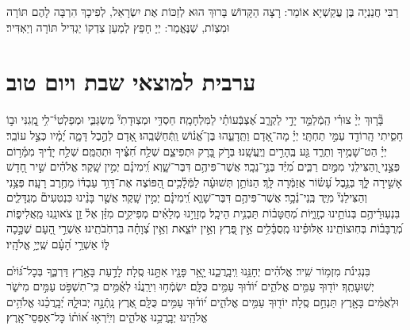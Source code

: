 \documentclass[twoside, openany, parskip=half, 11pt]{book}
\begin{document}

רַבִּי חֲנַנְיָה בֶּן עֲקַשְׁיָא אוֹמֵר: 
רָצָה הַקָּדוֹשׁ בָּרוּךְ הוּא לְזַכּוֹת אֶת יִשְׂרָאֵל, לְפִיכָךְ הִרְבָּה לָהֶם תּוֹרָה וּמִצְוֹת, 
שֶׁנֶּאֱמַר: יְיָ חָפֵץ לְמַעַן צִדְקוֹ יַגְדִּיל תּוֹרָה וְיַאְדִּיר׃


\mournerskaddish

\aleinu

\vfill
{}\quad{}\quad{}





\chapter[ערבית למוצאי שבת ויום טוב]{  ערבית למוצאי שבת ויום טוב }

 
 בָּ֘ר֤וּךְ יְיָ֨ צוּרִ֗י הַֽמְֿלַמֵּ֣ד יָדַ֣י לַקְרָ֑ב אֶ֝צְבְּֿעוֹתַ֗י לַמִּלְחָמָֽה׃ 
חַסְדִּ֥י וּמְצֽוּדָתִי֘ מִשְׂגַּבִּ֢י וּמְפַלְטִי֫־לִ֥י מָֽ֭גִנִּי וּב֣וֹ חָסִ֑יתִי הָֽרוֹדֵ֖ד עַמִּ֣י תַחְתָּֽי׃ 
יְיָ֗ מָה־אָ֭דָם וַתֵּֽדָעֵ֑הוּ בֶּן־אֱ֝נ֗וֹשׁ וַֽתְּֿחַשְּֿׁבֵֽהוּ׃ 
אָ֭דָם לַהֶ֣בֶל דָּמָ֑ה יָ֝מָ֗יו כְּצֵ֣ל עוֹבֵֽר׃ 
יְיָ֗ הַט־שָׁמֶ֥יךָ וְתֵרֵ֑ד גַּ֖ע בֶּֽהָרִ֣ים וְיֶֽעֱשָֽׁנוּ׃ 
בְּרֹ֣ק בָּ֭רָק וּתְפִיצֵ֑ם שְׁלַ֥ח חִ֝צֶּ֗יךָ וּתְהֻמֵּֽם׃ 
שְׁלַ֥ח יָדֶ֗יךָ מִמָּ֫ר֥וֹם פְּצֵ֣נִי וְ֭הַצִּילֵנִי מִמַּ֣יִם רַבִּ֑ים מִ֝יַּ֗ד בְּנֵ֣י־נֵכָֽר׃ 
אֲשֶׁר־פִּיהֶ֥ם דִּבֶּר־שָׁ֑וְא וִֽ֝ימִינָ֗ם יְמִ֣ין שָֽׁקֶר׃ 
אֱלֹהִ֗ים שִׁ֣יר חָ֭דָשׁ אָשִׁ֣ירָה לָּ֑ךְ בְּנֵ֥בֶל עָ֝שׂ֗וֹר אֲזַמְּֿרָה לָּֽךְ׃ 
הַנּוֹתֵ֥ן תְּשׁוּעָ֗ה לַמְּֿלָ֫כִ֥ים הַ֭פּוֹצֶה אֶת־דָּוִ֥ד עַבְדּ֗וֹ מֵחֶ֥רֶב רָעָֽה׃ 
פְּצֵ֥נִי וְהַצִּילֵנִי֘ מִיַּ֢ד בְּֽנֵי־נֵ֫כָ֥ר׃ 
אֲשֶׁר־פִּיהֶ֥ם דִּבֶּר־שָׁוְ֑א וִֽ֝ימִינָ֗ם יְמִ֣ין שָֽׁקֶר׃ 
אֲשֶׁ֤ר בָּנֵ֨ינוּ כִּנְטִעִים֘ מְגֻדָּלִ֢ים בִּנְעֽוּרֵ֫יהֶ֥ם בְּנוֹתֵ֥ינוּ כְזָֽוִ֑יּוֹת מְ֝חֻטָּב֗וֹת תַּבְנִ֥ית הֵיכָֽל׃ 
מְזָוֵי֣נוּ מְלֵאִ֗ים מְפִיקִ֥ים מִזַּ֗ן אֶל֫ זַ֥ן צֹאונֵֽנוּ מַֽאֲלִיפ֑וֹת מְ֝רֻבָּב֗וֹת בְּחֽוּצוֹתֵֽינוּ׃ 
אַלּוּפֵ֗ינוּ מְֽסֻבָּ֫לִ֥ים אֵ֣ין פֶּ֭רֶץ וְאֵ֣ין יוֹצֵ֑את וְאֵ֥ין צְ֝וָחָ֗ה בִּרְחֹֽבֹתֵֽינוּ׃ 
אַשְׁרֵ֣י הָ֭עָם שֶׁכָּ֣כָה לּ֑וֹ אַשְׁרֵ֥י הָ֝עָ֗ם שֶֽׁיְיָ֥ אֱלֹהָֽיו׃



  
  בִּנְגִינֹ֗ת מִזְמ֥וֹר שִֽׁיר׃ 
אֱלֹהִ֗ים יְחָנֵּ֥נוּ וִֽיבָֽרֲכֵ֑נוּ יָ֤אֵ֥ר פָּנָ֖יו אִתָּ֣נוּ סֶֽלָה׃ 
לָדַ֣עַת בָּאָ֣רֶץ דַּרְכֶּ֑ךָ בְּכָל־גּ֝וֹיִ֗ם יְשֽׁוּעָתֶֽךָ׃ 
יוֹד֖וּךָ עַמִּ֥ים אֱלֹהִ֑ים י֝וֹד֗וּךָ עַמִּ֥ים כֻּלָּֽם׃ 
יִשְׂמְֿח֥וּ וִירַֽנֲנ֗וּ לְאֻ֫מִּ֥ים כִּֽי־תִשְׁפֹּ֣ט עַמִּ֣ים מִישֹׁ֑ר 
וּלְאֻמִּ֓ים בָּאָ֖רֶץ תַּנְחֵ֣ם סֶֽלָה׃ 
יוֹד֖וּךָ עַמִּ֥ים אֱלֹהִ֑ים י֝וֹד֗וּךָ עַמִּ֥ים כֻּלָּֽם׃ 
אֶ֭רֶץ נָֽתְֿנָ֣ה יְבוּלָ֑הּ יְ֝בָֽרֲכֵ֗נוּ אֱלֹהִ֥ים אֱלֹהֵֽינוּ׃ 
יְבָֽרֲכֵ֥נוּ אֱלֹהִ֑ים וְיִֽיֿרְא֥וּ א֝וֹת֗וֹ כָּל־אַפְסֵי־אָֽרֶץ׃
\end{document}
